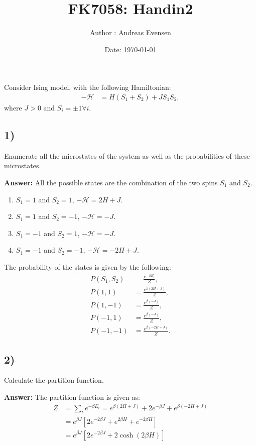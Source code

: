 \documentclass[a4paper]{article}
\title{FK7058: Handin2}
\author{Author : Andreas Evensen}
\date{Date: \today}
\newcommand{\newparagraph}{\vspace{.5cm}\noindent}
\begin{document}
\maketitle
\noindent
Consider Ising model, with the following Hamiltonian:
\begin{align*}
    -\mathcal{H} &= H(S_1 + S_2) + JS_1S_2,
\end{align*}where $J >0$ and $S_i = \pm 1 \forall i$.

\subsection*{1)}
Enumerate all the microstates of the system as well as the probabilities of these microstates.

\newparagraph
\textbf{Answer:} All the possible states are the combination of the two spins $S_1$ and $S_2$.
\begin{enumerate}
    \item $S_1 = 1$ and $S_2 = 1$, $-\mathcal{H} = 2H + J$. 
    \item $S_1 = 1$ and $S_2 = -1$, $-\mathcal{H} = -J$. 
    \item $S_1 = -1$ and $S_2 = 1$, $-\mathcal{H} = -J$. 
    \item $S_1 = -1$ and $S_2 = -1$, $-\mathcal{H} = -2H + J$. 
\end{enumerate}The probability of the states is given by the following:
\begin{align*}
    P(S_1, S_2) &= \frac{e^{-\beta E_i}}{Z},\\
    P(1, 1) &= \frac{e^{\beta(2H + J)}}{Z},\\
    P(1, -1) &= \frac{e^{\beta(-J)}}{Z},\\
    P(-1, 1) &= \frac{e^{\beta(-J)}}{Z},\\
    P(-1, -1) &= \frac{e^{\beta(-2H + J)}}{Z}.
\end{align*}

\subsection*{2)}
Calculate the partition function.

\newparagraph
\textbf{Answer:} The partition function is given as:
\begin{align*}
    Z &= \sum_i e^{-\beta E_i} = e^{\beta(2H + J)} + 2e^{-\beta J} + e^{\beta(-2H + J)}\\
    &= e^{\beta J}\left[2e^{-2\beta J} + e^{2\beta H} + e^{-2\beta H}\right]\\
    &= e^{\beta J}\left[2e^{-2\beta J} + 2\cosh(2\beta H)\right]
\end{align*}
\end{document}

